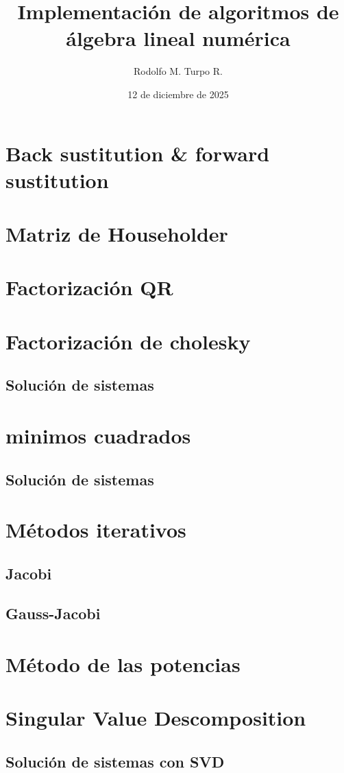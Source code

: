 \documentclass{article}
\title{Implementación de algoritmos de álgebra lineal numérica}
\author{Rodolfo M. Turpo R.}
\date{12 de diciembre de 2025}
\begin{document}
\maketitle
\tableofcontents
\newpage
\section{Back sustitution \& forward sustitution}

\section{Matriz de Householder}

\section{Factorización QR}

\section{Factorización de cholesky}

\subsection{Solución de sistemas}
\section{minimos cuadrados}
\subsection{Solución de sistemas}
\section{Métodos iterativos}
\subsection{Jacobi}
\subsection{Gauss-Jacobi}
\section{Método de las potencias}

\section{Singular Value Descomposition}
\subsection{Solución de sistemas con SVD}
\end{document}
